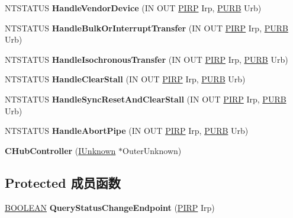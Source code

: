 \begin{DoxyCompactItemize}
\mbox{\label{class_c_hub_controller_a6050a172f9d29a8b1213bb07348036b0}} 
N\+T\+S\+T\+A\+T\+US {\bfseries Handle\+Vendor\+Device} (IN O\+UT \hyperlink{interfacevoid}{P\+I\+RP} Irp, \hyperlink{struct___u_r_b}{P\+U\+RB} Urb)
\item 
\mbox{\label{class_c_hub_controller_a36e09192595e7607a8a3f8d125b26367}} 
N\+T\+S\+T\+A\+T\+US {\bfseries Handle\+Bulk\+Or\+Interrupt\+Transfer} (IN O\+UT \hyperlink{interfacevoid}{P\+I\+RP} Irp, \hyperlink{struct___u_r_b}{P\+U\+RB} Urb)
\item 
\mbox{\label{class_c_hub_controller_aee5326ff67ec2c7028edd2695d903c60}} 
N\+T\+S\+T\+A\+T\+US {\bfseries Handle\+Isochronous\+Transfer} (IN O\+UT \hyperlink{interfacevoid}{P\+I\+RP} Irp, \hyperlink{struct___u_r_b}{P\+U\+RB} Urb)
\item 
\mbox{\label{class_c_hub_controller_a9d223fd819eb8f26556082f6e10cecb4}} 
N\+T\+S\+T\+A\+T\+US {\bfseries Handle\+Clear\+Stall} (IN O\+UT \hyperlink{interfacevoid}{P\+I\+RP} Irp, \hyperlink{struct___u_r_b}{P\+U\+RB} Urb)
\item 
\mbox{\label{class_c_hub_controller_a2f634af2147e01ea27d50ce52cd60725}} 
N\+T\+S\+T\+A\+T\+US {\bfseries Handle\+Sync\+Reset\+And\+Clear\+Stall} (IN O\+UT \hyperlink{interfacevoid}{P\+I\+RP} Irp, \hyperlink{struct___u_r_b}{P\+U\+RB} Urb)
\item 
\mbox{\label{class_c_hub_controller_a83d487dc7f4aeb8093fc1ea899adae02}} 
N\+T\+S\+T\+A\+T\+US {\bfseries Handle\+Abort\+Pipe} (IN O\+UT \hyperlink{interfacevoid}{P\+I\+RP} Irp, \hyperlink{struct___u_r_b}{P\+U\+RB} Urb)
\item 
\mbox{\label{class_c_hub_controller_ae393e53e7f7202c835d9114f7730209d}} 
{\bfseries C\+Hub\+Controller} (\hyperlink{interface_i_unknown}{I\+Unknown} $\ast$Outer\+Unknown)
\end{DoxyCompactItemize}
\subsection*{Protected 成员函数}
\begin{DoxyCompactItemize}
\item 
\mbox{\label{class_c_hub_controller_ae5a0a0258bd9f7eb47daca5ed20d8a9f}} 
\hyperlink{_processor_bind_8h_a112e3146cb38b6ee95e64d85842e380a}{B\+O\+O\+L\+E\+AN} {\bfseries Query\+Status\+Change\+Endpoint} (\hyperlink{interfacevoid}{P\+I\+RP} Irp)
\end{DoxyCompactItemize}
